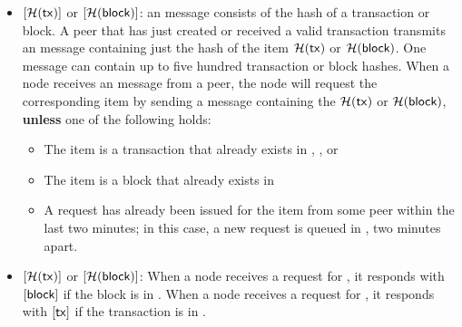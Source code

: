 \begin{itemize}
\item {}$[\mathcal{H}(\textnormal{\textsf{tx}})]$ or $[\mathcal{H}(\textsf{block})]$: an  message consists of the hash of a transaction or block. A peer that has just created or received a valid transaction transmits an  message containing just the hash of the item $\mathcal{H}(\textnormal{\textsf{tx}})$ or $\mathcal{H}(\textsf{block})$. One  message can contain up to five hundred transaction or block hashes. When a node receives an  message from a peer, the node will request the corresponding item by sending a  message containing the $\mathcal{H}(\textnormal{\textsf{tx}})$ or $\mathcal{H}(\textsf{block})$, \textbf{unless} one of the following holds:

\begin{itemize}
\item The item is a transaction that already exists in , , or 
\item The item is a block that already exists in 
\item A  request has already been issued for the item from some peer within the last two minutes; in this case, a new request is queued in , two minutes apart.
\end{itemize}

\item {}$[\mathcal{H}(\textnormal{\textsf{tx}})]$ or $[\mathcal{H}(\textsf{block})]$: When a node receives a request for \block, it responds with \break {}$[\textsf{block}]$ if the block is in .  When a node receives a request for \tx, it responds with $[\textnormal{\textsf{tx}}]$ if the transaction is in .

\end{itemize}
